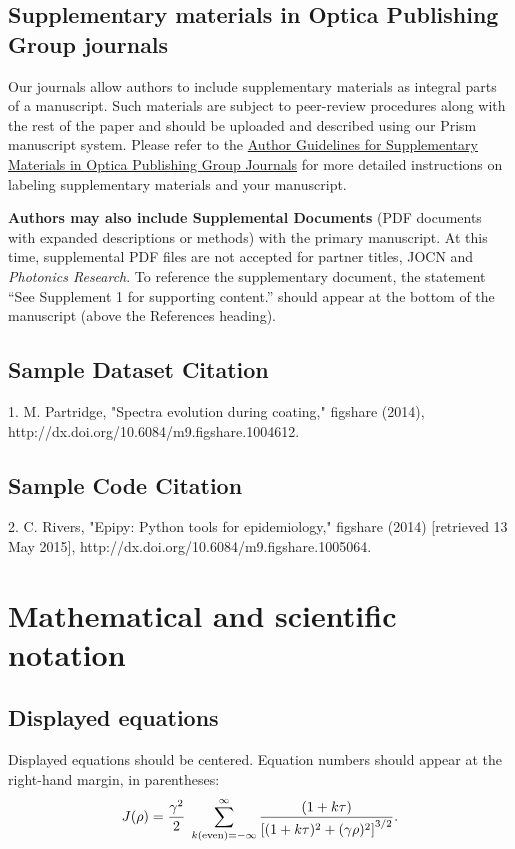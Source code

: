 \documentclass{optica-article}
\begin{document}
\subsection{Supplementary materials in Optica Publishing Group journals}
Our journals allow authors to include supplementary materials as integral parts of a manuscript. Such materials are subject to peer-review procedures along with the rest of the paper and should be uploaded and described using our Prism manuscript system. Please refer to the \href{https://opg.optica.org/submit/style/supplementary_materials.cfm}{Author Guidelines for Supplementary Materials in Optica Publishing Group Journals} for more detailed instructions on labeling supplementary materials and your manuscript.

\textbf{Authors may also include Supplemental Documents} (PDF documents with expanded descriptions or methods) with the primary manuscript. At this time, supplemental PDF files are not accepted for partner titles, JOCN and \emph{Photonics Research}. To reference the supplementary document, the statement ``See Supplement 1 for supporting content.'' should appear at the bottom of the manuscript (above the References heading). 

\subsection{Sample Dataset Citation}

1. M. Partridge, "Spectra evolution during coating," figshare (2014), http://dx.doi.org/10.6084/m9.figshare.1004612.

\subsection{Sample Code Citation}

2. C. Rivers, "Epipy: Python tools for epidemiology," figshare (2014) [retrieved 13 May 2015], http://dx.doi.org/10.6084/m9.figshare.1005064.



\section{Mathematical and scientific notation}

\subsection{Displayed equations} Displayed equations should be centered.
Equation numbers should appear at the right-hand margin, in
parentheses:
\begin{equation}
J(\rho) =
 \frac{\gamma^2}{2} \; \sum_{k({\rm even}) = -\infty}^{\infty}
	\frac{(1 + k \tau)}{ \left[ (1 + k \tau)^2 + (\gamma  \rho)^2  \right]^{3/2} }.
\end{equation}
\end{document}
